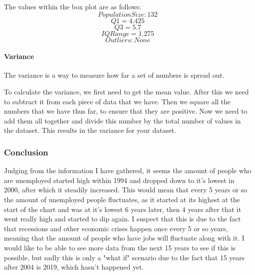 \documentclass[a4paper,12pt]{article}
\begin{document}
    The values within the box plot are as follows:
    \[
      Population Size: 132
    \]
    \[
      Q1 = 4.425
    \]
    \[
      Q3 = 5.7
    \]
    \[
      IQ Range = 1.275
    \]
    \[
      Outliers: None
    \]

    \paragraph{Variance}
      The variance is a way to measure how far a set of numbers is spread out.

      To calculate the variance, we first need to get the mean value. After this we need to subtract it from each piece of data that we have. Then we square all the numbers that we have thus far, to ensure that they are positive. Now we need to add them all together and divide this number by the total number of values in the dataset. This results in the variance for your dataset.

  \subsubsection{Conclusion}
    Judging from the information I have gathered, it seems the amount of people who are unemployed started high within 1994 and dropped down to it's lowest in 2000, after which it steadily increased. This would mean that every 5 years or so the amount of unemployed people fluctuates, as it started at its highest at the start of the chart and was at it's lowest 6 years later, then 4 years after that it went really high and started to dip again. I suspect that this is due to the fact that recessions and other economic crises happen once every 5 or so years, meaning that the amount of people who have jobs will fluctuate along with it. I would like to be able to see more data from the next 15 years to see if this is possible, but sadly this is only a "what if" scenario due to the fact that 15 years after 2004 is 2019, which hasn't happened yet.

\newpage
\end{document}
